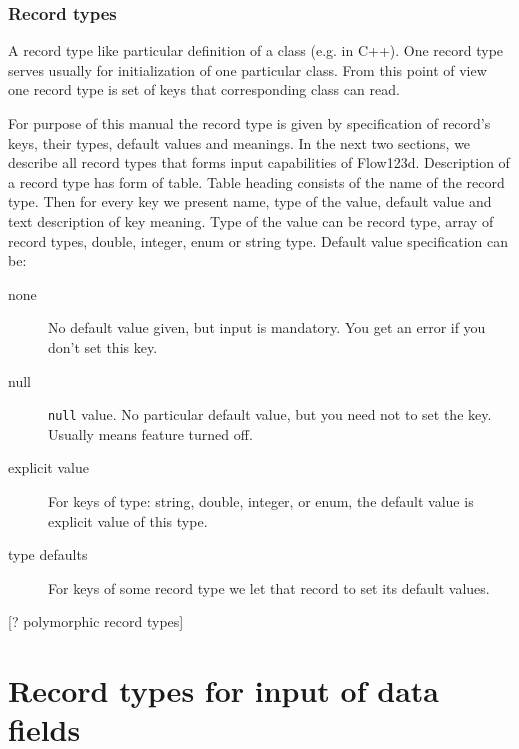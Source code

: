 \subsubsection{Record types}
A record type like particular definition of a class (e.g. in C++). One record type serves usually for initialization of 
one particular class. From this point of view one record type is set of keys that corresponding class can read.

For purpose of this manual the record type is given by specification of record's keys, their types, default values and meanings.
In the next two sections, we describe all record types that forms input capabilities of Flow123d. Description of a record type 
has form of table. Table heading consists of the name of the record type. Then for every key we present name, type of the value,
default value and text description of key meaning. Type of the value can be record type, array of record types, double, integer, enum or 
string type. Default value specification can be:
\begin{description} 
 \item[none] No default value given, but input is mandatory. You get an error if you don't set this key.
 \item[null] \verb'null' value. No particular default value, but you need not to set the key. Usually means feature turned off.
 \item[explicit value] For keys of type: string, double, integer, or enum, the default value is explicit value of this type.
 \item[type defaults] For keys of some record type we let that record to set its default values.
\end{description}

[? polymorphic record types]






\section{Record types for input of data fields}


\newenvironment{recordtype}[2]
{\par
 \vskip 2ex
 \noindent%
 record type: {\bf #1}#2
 \par%
 \vskip 0.5ex
 \hrule%
 \vskip 0.3ex
 \hrule
 \begingroup%
  \addtolength{\leftskip}{3em}%
  \gdef\keyitem##1##2##3{%
    \par
    \vskip 0.3ex
    \noindent%
    \hspace{-3em}{\bf\tt ##1} = {\it \textless ##2\textgreater} \hfill \makebox[0.4\textwidth][l]{DEFAULT: {##3}\hfil}%
    \par
  }%
}{%
  \vskip 0.7ex  
  \hrule%
  \vskip 0.5ex
  \endgroup%
}

